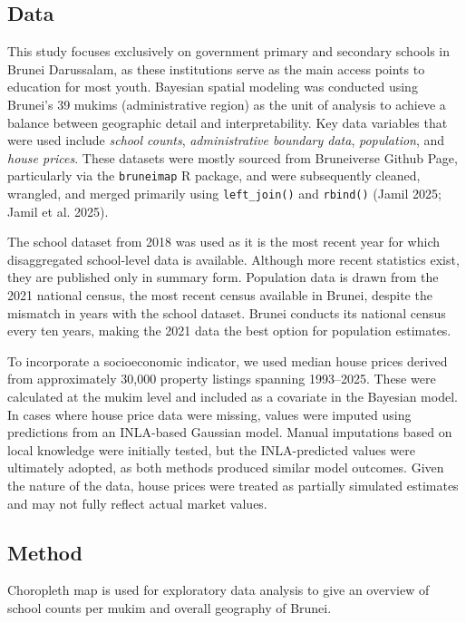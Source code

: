 \documentclass[
  12pt,
]{article}
\begin{document}
\subsection{Data}\label{data}

This study focuses exclusively on government primary and secondary
schools in Brunei Darussalam, as these institutions serve as the main
access points to education for most youth. Bayesian spatial modeling was
conducted using Brunei's 39 mukims (administrative region) as the unit
of analysis to achieve a balance between geographic detail and
interpretability. Key data variables that were used include \emph{school
counts}, \emph{administrative boundary data}, \emph{population}, and
\emph{house prices}. These datasets were mostly sourced from Bruneiverse
Github Page, particularly via the \texttt{bruneimap} R package, and were
subsequently cleaned, wrangled, and merged primarily using
\texttt{left\_join()} and \texttt{rbind()} (Jamil 2025; Jamil et al.
2025).

The school dataset from 2018 was used as it is the most recent year for
which disaggregated school-level data is available. Although more recent
statistics exist, they are published only in summary form. Population
data is drawn from the 2021 national census, the most recent census
available in Brunei, despite the mismatch in years with the school
dataset. Brunei conducts its national census every ten years, making the
2021 data the best option for population estimates.

To incorporate a socioeconomic indicator, we used median house prices
derived from approximately 30,000 property listings spanning 1993--2025.
These were calculated at the mukim level and included as a covariate in
the Bayesian model. In cases where house price data were missing, values
were imputed using predictions from an INLA-based Gaussian model. Manual
imputations based on local knowledge were initially tested, but the
INLA-predicted values were ultimately adopted, as both methods produced
similar model outcomes. Given the nature of the data, house prices were
treated as partially simulated estimates and may not fully reflect
actual market values.

\subsection{Method}\label{sec-method}

Choropleth map is used for exploratory data analysis to give an overview
of school counts per mukim and overall geography of Brunei.
\end{document}

